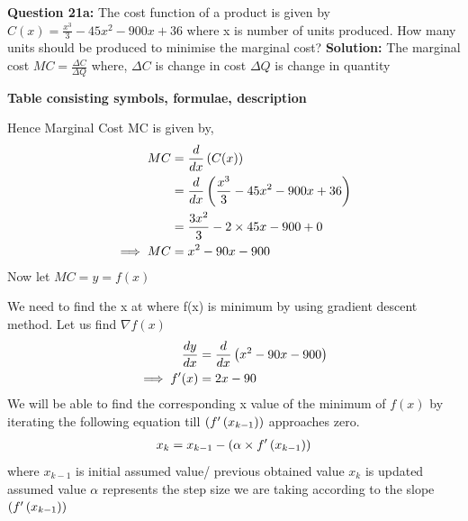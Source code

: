 \documentclass[journal,12pt,twocolumn]{IEEEtran}
\begin{document}
\begin{flushleft}
\textbf{Question 21a:}\newline
The cost function of a product is given by $C(x) = \frac{x^3}{3}-45x^2-900x+36$ where x is number of units produced. How many units should be produced to minimise the marginal cost?\newline
\textbf{Solution:}\newline
The marginal cost $MC = \frac{\Delta C}{\Delta Q}$ where,\newline
$\Delta C$ is change in cost\newline
$\Delta Q$ is change in quantity \newline
\begin{table}[h] 
\caption{\textbf{Table consisting symbols, formulae, description}}
\label{table:1}

\end{table}

Hence Marginal Cost MC is given by,
\begin{align}
    MC &= \frac{d}{dx}\left(C(x)\right) \\
    &= \frac{d}{dx}\left(\frac{x^3}{3}-45x^2-900x+36\right)\\
    &= \frac{3x^2}{3}-2\times45x-900+0\\
    \implies MC &= x^2 -90x -900 
\end{align}
Now let $MC = y = f(x)$\newline

We need to find the x at where f(x) is minimum by using gradient descent method.
Let us find $\nabla f(x)$
\begin{align}
    \frac{dy}{dx} &= \frac{d}{dx}\left(x^2-90x-900\right) \\
   \implies f^{\prime}(x) &= 2x-90
\end{align}
We will be able to find the corresponding x value of the minimum of $f(x)$ by iterating the following equation till $\left(f^{\prime}\left(x_{k-1}\right)\right)$ approaches zero.
\begin{align}
x_{k} = x_{k-1} - \left(\alpha\times f^{\prime}\left(x_{k-1}\right)\right) 
\end{align}
where $x_{k-1}$ is initial assumed value/ previous obtained value \newline
$x_k$ is updated assumed value \newline
$\alpha$ represents the step size we are taking according to the slope $\left(f^{\prime}\left(x_{k-1}\right)\right)$


\end{flushleft}
\end{document}
